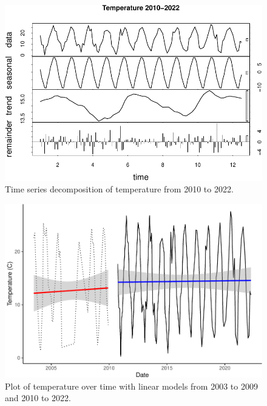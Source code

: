 \documentclass[
  12pt,
]{article}
\begin{document}
\begin{figure}

{\centering \includegraphics{Project_Template_files/figure-latex/Plot of Late Temperature Time Series Decomposition-1} 

}

\caption{Time series decomposition of temperature from 2010 to 2022.}\label{fig:Plot of Late Temperature Time Series Decomposition}
\end{figure}

\newpage

\begin{figure}

{\centering \includegraphics{Project_Template_files/figure-latex/Plot of Temperature over time with LMs-1} 

}

\caption{Plot of temperature over time with linear models from 2003 to 2009 and 2010 to 2022.}\label{fig:Plot of Temperature over time with LMs}
\end{figure}
\end{document}
